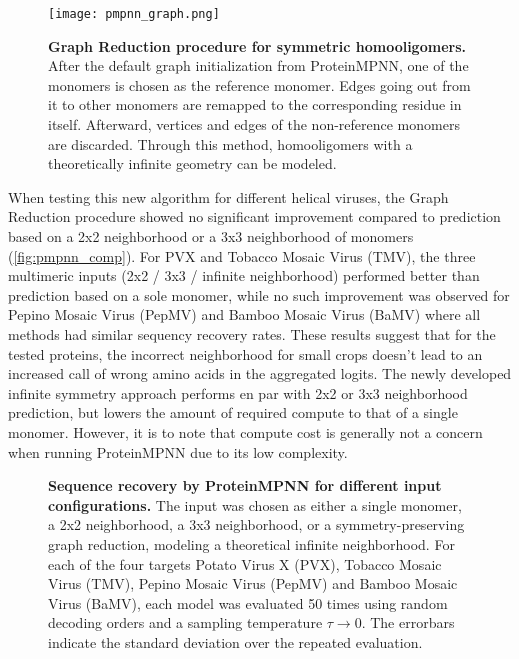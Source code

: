 \begin{figure}
\centering
\texttt{[image: pmpnn\_graph.png]}
\caption{\textbf{Graph Reduction procedure for symmetric homooligomers.} After the default graph initialization from ProteinMPNN, one of the monomers is chosen as the reference monomer. Edges going out from it to other monomers are remapped to the corresponding residue in itself. Afterward, vertices and edges of the non-reference monomers are discarded. Through this method, homooligomers with a theoretically infinite geometry can be modeled. }
\label{fig:pmpnn_graph}
\end{figure}

When testing this new algorithm for different helical viruses, the Graph Reduction procedure showed no significant improvement compared to prediction based on a 2x2 neighborhood or a 3x3 neighborhood of monomers (\autoref{fig:pmpnn_comp}). For PVX and Tobacco Mosaic Virus (TMV), the three multimeric inputs (2x2 / 3x3 / infinite neighborhood) performed better than prediction based on a sole monomer, while no such improvement was observed for Pepino Mosaic Virus (PepMV) and Bamboo Mosaic Virus (BaMV) where all methods had similar sequency recovery rates. These results suggest that for the tested proteins, the incorrect neighborhood for small crops doesn't lead to an increased call of wrong amino acids in the aggregated logits. The newly developed infinite symmetry approach performs en par with 2x2 or 3x3 neighborhood prediction, but lowers the amount of required compute to that of a single monomer. However, it is to note that compute cost is generally not a concern when running ProteinMPNN due to its low complexity. 

\begin{figure}
\centering

\caption{\textbf{Sequence recovery by ProteinMPNN for different input configurations.} The input was chosen as either a single monomer, a 2x2 neighborhood, a 3x3 neighborhood, or a symmetry-preserving graph reduction, modeling a theoretical infinite neighborhood. For each of the four targets Potato Virus X (PVX), Tobacco Mosaic Virus (TMV), Pepino Mosaic Virus (PepMV) and Bamboo Mosaic Virus (BaMV), each model was evaluated 50 times using random decoding orders and a sampling temperature $\tau\rightarrow 0$. The errorbars indicate the standard deviation over the repeated evaluation. }
\label{fig:pmpnn_comp}
\end{figure}

